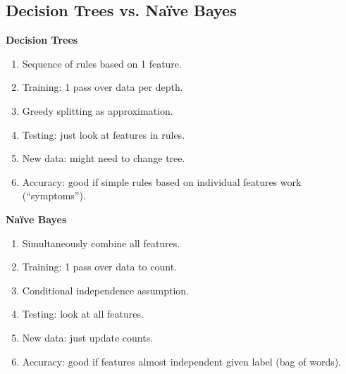 \documentclass{article}
\theoremstyle{definition}
\begin{document}
\subsection*{Decision Trees vs. Naïve Bayes}
\begin{multicols}{2}
	\textbf{Decision Trees}
	\begin{enumerate}
		\item Sequence of rules based on 1 feature.
		\item Training: 1 pass over data per depth.
		\item Greedy splitting as approximation.
		\item Testing: just look at features in rules.
		\item New data: might need to change tree.
		\item Accuracy: good if simple rules based on individual features work (“symptoms”).
	\end{enumerate}
\textbf{Naïve Bayes}
\begin{enumerate}
	\item Simultaneously combine all features.
	\item Training: 1 pass over data to count.
	\item Conditional independence assumption.
	\item Testing: look at all features.
	\item New data: just update counts.
	\item Accuracy: good if features almost independent given label (bag of words).
\end{enumerate}

\end{multicols}
\end{document}
